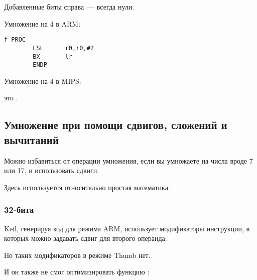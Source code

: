 Добавленные биты справа~--- всегда нули.

Умножение на 4 в ARM:

\begin{lstlisting}[caption=\NonOptimizingKeilVI (\ARMMode)]
f PROC
        LSL      r0,r0,#2
        BX       lr
        ENDP
\end{lstlisting}

Умножение на 4 в MIPS:



 это .

\subsection{Умножение при помощи сдвигов, сложений и вычитаний}
\label{multiplication_using_shifts_adds_subs}

Можно избавиться от операции умножения, если вы умножаете на числа вроде 7 или 17,
и использовать сдвиги.

Здесь используется относительно простая математика.

\subsubsection{32-бита}







Keil, генерируя код для режима ARM, использует модификаторы инструкции, в которых можно задавать
сдвиг для второго операнда:



Но таких модификаторов в режиме Thumb нет.

И он также не смог оптимизировать функцию :







